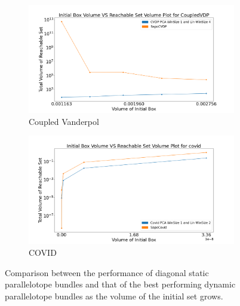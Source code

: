 \begin{figure}[h!]
    \hspace{-1.5em}
    \begin{subfigure}{0.5\textwidth}
    \centering
    \includegraphics[width=1.1\textwidth, height=0.75\textwidth]{figures/InitVolVSReachVol/CVDPInitReachVol.png}
    \caption{Coupled Vanderpol}
    \end{subfigure}%
    \begin{subfigure}{0.5\textwidth}
    \centering
    \includegraphics[width=1.1\textwidth, height=0.75\textwidth]{figures/InitVolVSReachVol/CovidInitReachVol.png}
    \caption{COVID}
    \end{subfigure}

    \caption{Comparison between the performance of diagonal static parallelotope bundles and that of the best performing dynamic parallelotope bundles as the volume of the initial set grows.}
    \label{fig:InitVolReachComp}
\end{figure}
\newpage

